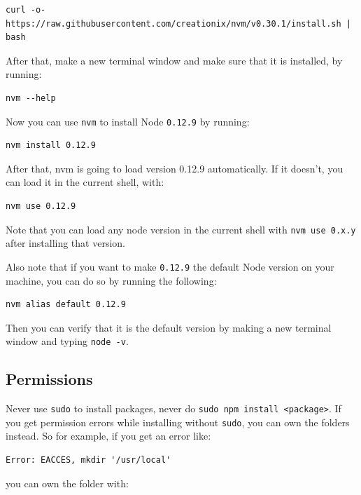 \documentclass[12pt,]{article}
\begin{document}
\begin{verbatim}
curl -o- https://raw.githubusercontent.com/creationix/nvm/v0.30.1/install.sh | bash
\end{verbatim}

After that, make a new terminal window and make sure that it is
installed, by running:

\begin{verbatim}
nvm --help
\end{verbatim}

Now you can use \texttt{nvm} to install Node \texttt{0.12.9} by running:

\begin{verbatim}
nvm install 0.12.9
\end{verbatim}

After that, nvm is going to load version 0.12.9 automatically. If it
doesn't, you can load it in the current shell, with:

\begin{verbatim}
nvm use 0.12.9
\end{verbatim}

Note that you can load any node version in the current shell with
\texttt{nvm\ use\ 0.x.y} after installing that version.

Also note that if you want to make \texttt{0.12.9} the default Node
version on your machine, you can do so by running the following:

\begin{verbatim}
nvm alias default 0.12.9
\end{verbatim}

Then you can verify that it is the default version by making a new
terminal window and typing \texttt{node\ -v}.

\subsection{Permissions}\label{permissions}

Never use \texttt{sudo} to install packages, never do
\texttt{sudo\ npm\ install\ \textless{}package\textgreater{}}. If you
get permission errors while installing without \texttt{sudo}, you can
own the folders instead. So for example, if you get an error like:

\begin{verbatim}
Error: EACCES, mkdir '/usr/local'
\end{verbatim}

you can own the folder with:
\end{document}
